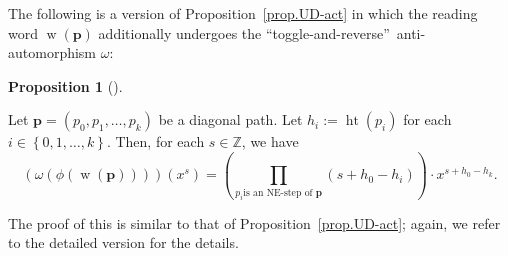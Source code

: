 \documentclass[numbers=enddot,12pt,final,onecolumn,notitlepage]{scrartcl}%
\theoremstyle{definition}
\newtheorem{prop}[theo]{Proposition}
\newenvironment{proposition}[1][]
{\begin{prop}[#1]\begin{leftbar}}
{\end{leftbar}\end{prop}}
\newcommand{\ZZ}{\mathbb{Z}}
\newcommand{\pp}{\mathbf{p}}
\newcommand{\w}{\operatorname{w}}
\newcommand{\htt}{\operatorname{ht}}
\newenvironment{vershort}{}{}
\begin{document}
The following is a version of Proposition~\ref{prop.UD-act} in which the
reading word $\w\left(  \pp\right)  $ additionally
undergoes the ``toggle-and-reverse''\ anti-automorphism $\omega$:

\begin{proposition}
\label{prop.DU-act}
Let $\pp=\left(  p_{0},p_{1},\ldots,p_{k}\right)  $
be a diagonal path. Let $h_{i}:=\htt\left(  p_{i}\right)  $ for
each $i\in\left\{  0,1,\ldots,k\right\}  $. Then, for each $s\in\ZZ$,
we have%
\[
\left(  \omega\left(  \phi\left(  \w\left(  \pp\right)
\right)  \right)  \right)  \left(  x^{s}\right)  =\left(  \prod_{p_{i}\text{
is an NE-step of }\pp}\left(  s+h_{0}-h_{i}\right)  \right)  \cdot
x^{s+h_{0}-h_{k}}.
\]

\end{proposition}

\begin{vershort}
The proof of this is similar to that of Proposition~\ref{prop.UD-act}; again, we refer to the detailed version for the details.
\end{vershort}
\end{document}
